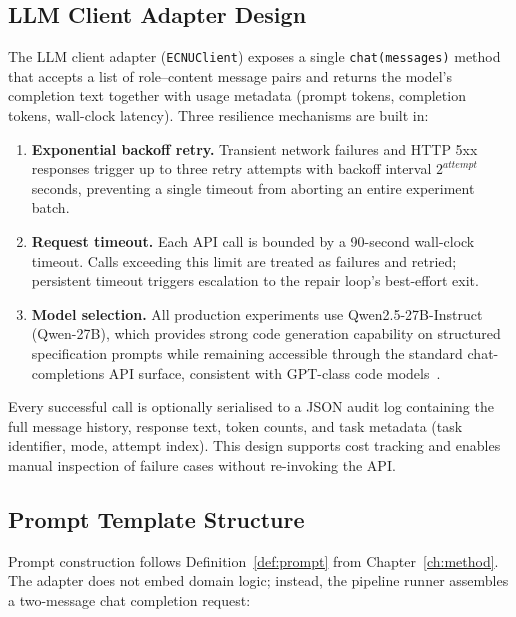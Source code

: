 \subsection{LLM Client Adapter Design}

The LLM client adapter (\texttt{ECNUClient}) exposes a single \texttt{chat(messages)}
method that accepts a list of role--content message pairs and returns the
model's completion text together with usage metadata (prompt tokens,
completion tokens, wall-clock latency).  Three resilience mechanisms are
built in:

\begin{enumerate}
  \item \textbf{Exponential backoff retry.}  Transient network failures and
        HTTP 5xx responses trigger up to three retry attempts with backoff
        interval $2^{\mathit{attempt}}$ seconds, preventing a single timeout
        from aborting an entire experiment batch.
  \item \textbf{Request timeout.}  Each API call is bounded by a
        90-second wall-clock timeout.  Calls exceeding this limit are
        treated as failures and retried; persistent timeout triggers
        escalation to the repair loop's best-effort exit.
  \item \textbf{Model selection.}  All production experiments use
        Qwen2.5-27B-Instruct (\textsf{Qwen-27B}), which provides strong code
        generation capability on structured specification prompts while
        remaining accessible through the standard chat-completions API
        surface, consistent with GPT-class code models~\citep{openai2023gpt4,chen2021codex}.
\end{enumerate}

Every successful call is optionally serialised to a JSON audit log containing
the full message history, response text, token counts, and task metadata
(task identifier, mode, attempt index).  This design supports cost tracking
and enables manual inspection of failure cases without re-invoking the API.

\subsection{Prompt Template Structure}

Prompt construction follows Definition~\ref{def:prompt} from
Chapter~\ref{ch:method}.  The adapter does not embed domain logic; instead,
the pipeline runner assembles a two-message chat completion request:

